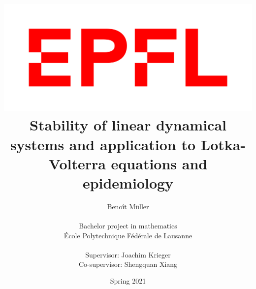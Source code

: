 \documentclass[a4paper]{report}
\title{ \includegraphics[scale=0.19]{images/EPFL-logo.png}  \linebreak \linebreak
\bf{Stability of linear dynamical systems and application to Lotka-Volterra equations and epidemiology}}
\author{Benoît Müller \\ \\
Bachelor project in mathematics \\ 
École Polytechnique Fédérale de Lausanne \\ \\
Supervisor: Joachim Krieger \\
Co-supervisor: Shengquan Xiang }
\date{Spring 2021}
\theoremstyle{definition}
\theoremstyle{remark}
\begin{document}
    \maketitle
    
    \tableofcontents
    
    
    
     
    
    \nocite{*}
    \printbibliography
\end{document}
